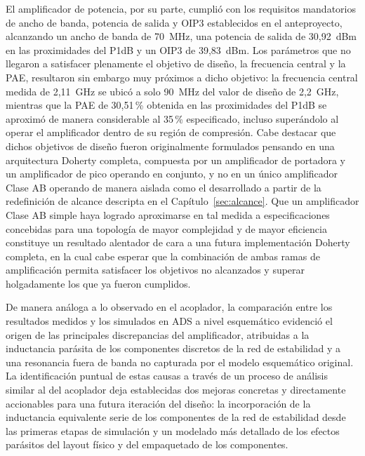 El amplificador de potencia, por su parte, cumplió con los requisitos mandatorios de ancho de banda, potencia de salida y OIP3 establecidos en el anteproyecto, alcanzando un ancho de banda de 70~MHz, una potencia de salida de 30,92~dBm en las proximidades del P1dB y un OIP3 de 39,83~dBm. Los parámetros que no llegaron a satisfacer plenamente el objetivo de diseño, la frecuencia central y la PAE, resultaron sin embargo muy próximos a dicho objetivo: la frecuencia central medida de 2,11~GHz se ubicó a solo 90~MHz del valor de diseño de 2,2~GHz, mientras que la PAE de 30,51\,\% obtenida en las proximidades del P1dB se aproximó de manera considerable al 35\,\% especificado, incluso superándolo al operar el amplificador dentro de su región de compresión. Cabe destacar que dichos objetivos de diseño fueron originalmente formulados pensando en una arquitectura Doherty completa, compuesta por un amplificador de portadora y un amplificador de pico operando en conjunto, y no en un único amplificador Clase AB operando de manera aislada como el desarrollado a partir de la redefinición de alcance descripta en el Capítulo~\ref{sec:alcance}. Que un amplificador Clase AB simple haya logrado aproximarse en tal medida a especificaciones concebidas para una topología de mayor complejidad y de mayor eficiencia constituye un resultado alentador de cara a una futura implementación Doherty completa, en la cual cabe esperar que la combinación de ambas ramas de amplificación permita satisfacer los objetivos no alcanzados y superar holgadamente los que ya fueron cumplidos.

De manera análoga a lo observado en el acoplador, la comparación entre los resultados medidos y los simulados en ADS a nivel esquemático evidenció el origen de las principales discrepancias del amplificador, atribuidas a la inductancia parásita de los componentes discretos de la red de estabilidad y a una resonancia fuera de banda no capturada por el modelo esquemático original. La identificación puntual de estas causas a través de un proceso de análisis similar al del acoplador deja establecidas dos mejoras concretas y directamente accionables para una futura iteración del diseño: la incorporación de la inductancia equivalente serie de los componentes de la red de estabilidad desde las primeras etapas de simulación y un modelado más detallado de los efectos parásitos del layout físico y del empaquetado de los componentes.

